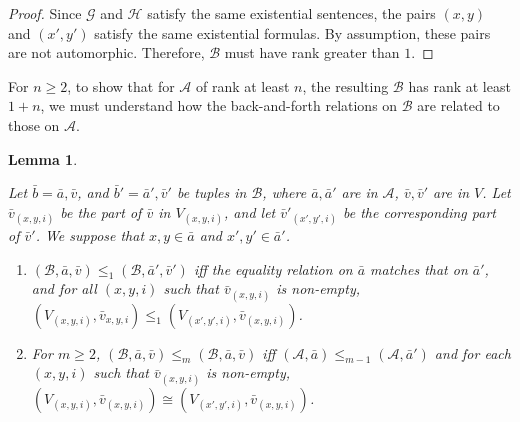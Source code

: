 \documentclass{article}
\newtheorem{lem}[thm]{Lemma}
\begin{document}
\begin{proof}  

Since $\mathcal{G}$ and $\mathcal{H}$ satisfy the same existential sentences, the pairs $(x,y)$ and $(x',y')$ satisfy the same existential formulas. By assumption, these pairs are not automorphic. Therefore, $\mathcal{B}$ must have rank greater than $1$.
\end{proof}
  
For $n\geq 2$, to show that for $\mathcal{A}$ of rank at least $n$, the resulting $\mathcal{B}$ has rank at least $1+n$, we must understand how the back-and-forth relations on $\mathcal{B}$ are related to those on $\mathcal{A}$.  

\begin{lem}
\label{back&forth}

Let $\bar{b} = \bar{a},\bar{v}$, and $\bar{b}' = \bar{a}',\bar{v}'$ be tuples in $\mathcal{B}$, where $\bar{a},\bar{a}'$ are in $\mathcal{A}$, $\bar{v},\bar{v}'$ are in $V$.  Let $\bar{v}_{(x,y,i)}$ be the part of $\bar{v}$ in $V_{(x,y,i)}$, and let $\bar{v}'_{(x',y',i)}$ be the corresponding part of $\bar{v}'$.  We suppose that $x,y\in\bar{a}$ and $x',y'\in\bar{a}'$.
\begin{enumerate}

\item [(a)]  $(\mathcal{B},\bar{a},\bar{v})\leq_1 (\mathcal{B},\bar{a}',\bar{v}')$ iff the equality relation on $\bar{a}$ matches that on $\bar{a}'$, and for all $(x,y,i)$ such that $\bar{v}_{(x,y,i)}$ is non-empty, 
$(V_{(x,y,i)},\bar{v}_{x,y,i})\leq_1(V_{(x',y',i)},\bar{v}_{(x,y,i)})$.  

\item [(b)]  For $m \geq 2$, $(\mathcal{B},\bar{a},\bar{v})\leq_m(\mathcal{B},\bar{a},\bar{v})$ iff $(\mathcal{A},\bar{a})\leq_{m-1}(\mathcal{A},\bar{a}')$ and for each $(x,y,i)$ such that $\bar{v}_{(x,y,i)}$ is non-empty, $(V_{(x,y,i)},\bar{v}_{(x,y,i)})\cong(V_{(x',y',i)},\bar{v}_{(x,y,i)})$.

\end{enumerate}

\end{lem}
\end{document}
